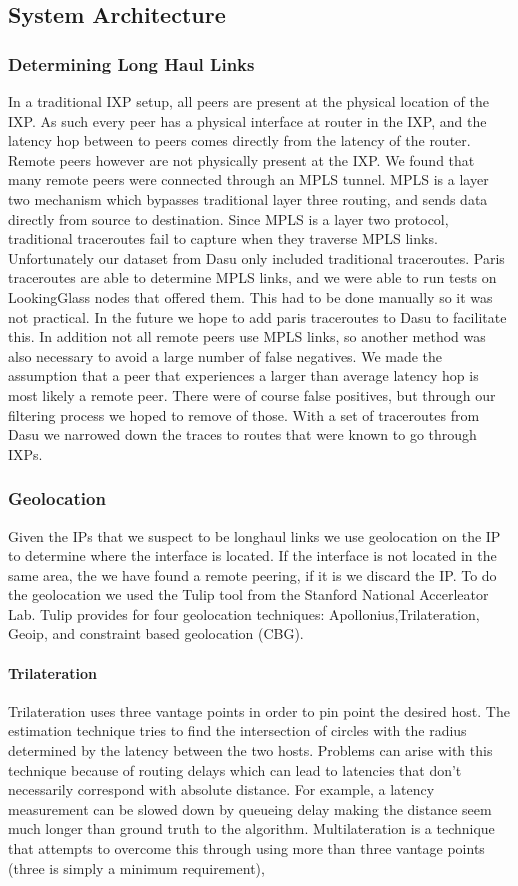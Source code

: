 \documentclass{acm_proc_article-sp}
\begin{document}
\subsection{System Architecture}
\subsubsection{Determining Long Haul Links}
In a traditional IXP setup, all peers are present at the physical location of the IXP. 
As such every peer has a physical interface at router in the IXP, and the latency hop between
to peers comes directly from the latency of the router. Remote peers however are not physically 
present at the IXP. We found that many remote peers were connected through an MPLS tunnel.
MPLS is a layer two mechanism which bypasses traditional layer three routing, and sends data directly
from source to destination. Since MPLS is a layer two protocol, traditional traceroutes fail to capture when 
they traverse MPLS links. Unfortunately our dataset from Dasu only included traditional traceroutes. Paris traceroutes
are able to determine MPLS links, and we were able to run tests on LookingGlass nodes that offered them. This had to be done
manually so it was not practical. In the future we hope to add paris traceroutes to Dasu to facilitate this. 
In addition not all remote peers use MPLS links, so another method was also necessary to avoid a large number of
false negatives.  
We made the assumption that a peer that experiences a larger than average
latency hop is most likely a remote peer. There were of course false positives, but 
through our filtering process we hoped to remove of those. With a set of traceroutes from
Dasu \cite{Sanchez:2011} we narrowed down the traces to routes that were known to go through IXPs.
\subsubsection{Geolocation}
Given the IPs that we suspect to be longhaul links we use geolocation on the IP to determine where
the interface is located. If the interface is not located in the same area, the we have found a 
remote peering, if it is we discard the IP. To do the geolocation we used the Tulip tool from the Stanford
National Accerleator Lab. 
Tulip provides for four geolocation techniques: Apollonius,Trilateration, Geoip, and constraint based geolocation (CBG).
\paragraph{Trilateration}
Trilateration uses three vantage points in order to pin point the desired host. The estimation technique tries to find the intersection of 
circles with the radius determined by the latency between the two hosts. Problems can arise with this technique because of routing delays
which can lead to latencies that don't necessarily correspond with absolute distance. For example, a latency measurement can be slowed down by queueing delay
making the distance seem much longer than ground truth to the algorithm. Multilateration is a technique that attempts to overcome this through using more than three
vantage points (three is simply a minimum requirement), 
\end{document}
